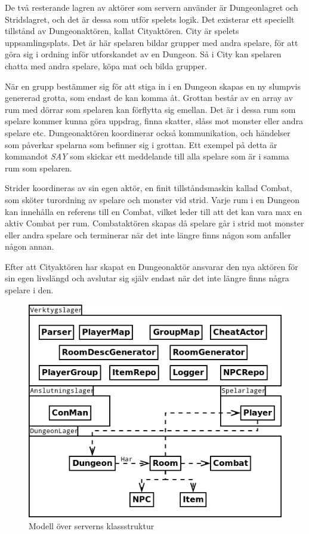 \documentclass[a4paper]{article}
\begin{document}
De två resterande lagren av aktörer som servern använder är Dungeonlagret och Stridslagret, och det är dessa som utför spelets logik. Det existerar ett speciellt tillstånd av Dungeonaktören, kallat Cityaktören. City är spelets uppsamlingsplats. Det är här spelaren bildar grupper med andra spelare, för att göra sig i ordning inför utforskandet av en Dungeon. Så i City kan spelaren chatta med andra spelare, köpa mat och bilda grupper.

När en grupp bestämmer sig för att stiga in i en Dungeon skapas en ny slumpvis genererad grotta, som endast de kan komma åt. Grottan består av en array av rum med dörrar som spelaren kan förflytta sig emellan. Det är i dessa rum som spelare kommer kunna göra uppdrag, finna skatter, slåss mot monster eller andra spelare etc. Dungeonaktören koordinerar också kommunikation, och händelser som påverkar spelarna som befinner sig i grottan. Ett exempel på detta är kommandot \textit{SAY} som skickar ett meddelande till alla spelare som är i samma rum som spelaren. 

Strider koordineras av sin egen aktör, en finit tillståndsmaskin kallad Combat, som sköter turordning av spelare och monster vid strid. Varje rum i en Dungeon kan innehålla en referens till en Combat, vilket leder till att det kan vara max en aktiv Combat per rum. Combataktören skapas då spelare går i strid mot monster eller andra spelare och terminerar när det inte längre finns någon som anfaller någon annan. 

Efter att Cityaktören har skapat en Dungeonaktör ansvarar den nya aktören för sin egen livslängd och avslutar sig själv endast när det inte längre finns några spelare i den.

\begin{figure}[hbt]
\centering
\includegraphics[width=1.0\textwidth]{serverUml2}
\caption{\label{fig:ServerKlassModell}Modell över serverns klassstruktur}
\end{figure}
\end{document}
